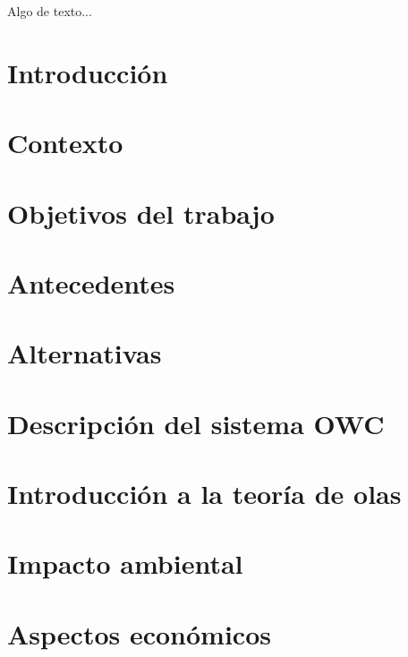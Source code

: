 \label{ch:memoria}

Algo de texto...

\section{Introducción}\label{sec:intro}
\section{Contexto}\label{sec:contexto}
\section{Objetivos del trabajo}\label{sec:objetivos}
\section{Antecedentes}\label{sec:antecedentes}
\section{Alternativas}\label{sec:alternativas}
\section{Descripción del sistema OWC}\label{sec:descripcionOWC}
\section{Introducción a la teoría de olas}\label{sec:teoriaolas}
\section{Impacto ambiental}\label{sec:impactoambiental}
\section{Aspectos económicos}\label{sec:aspectoseconomicos}
